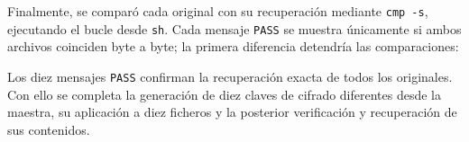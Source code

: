 Finalmente, se comparó cada original con su recuperación mediante \texttt{cmp -s}, ejecutando el bucle desde \texttt{sh}.
Cada mensaje \texttt{PASS} se muestra únicamente si ambos archivos coinciden byte a byte; la primera diferencia detendría las comparaciones:

\noindent\begin{minipage}{\linewidth}
\begingroup
\renewcommand{\lstlistingname}{Salida y verificación}

\endgroup
\end{minipage}

Los diez mensajes \texttt{PASS} confirman la recuperación exacta de todos los originales.
Con ello se completa la generación de diez claves de cifrado diferentes desde la maestra, su aplicación a diez ficheros y la posterior verificación y recuperación de sus contenidos.
